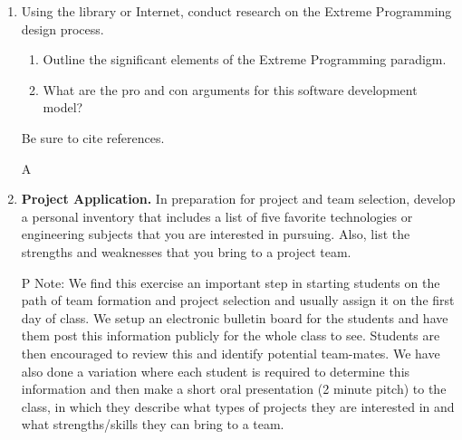 \begin{enumerate}
\item
  Using the library or Internet, conduct research on the Extreme
  Programming design process.
 \begin{enumerate}
\item  Outline the significant elements of the Extreme Programming paradigm.
\item  What are the pro and con arguments for this software development
  model?
\end{enumerate}
Be sure to cite references.

\begin{solution}{A}{





}
\end{solution}

\item
  \textbf{Project Application.} In preparation for project and team
  selection, develop a personal inventory that includes a list of five
  favorite technologies or engineering subjects that you are interested
  in pursuing. Also, list the strengths and weaknesses that you bring to
  a project team.
  \begin{solution}{P}{
Note: We find this exercise an important step in starting
students on the path of team formation and project selection and usually
assign it on the first day of class. We setup an electronic bulletin
board for the students and have them post this information publicly for
the whole class to see. Students are then encouraged to review this and
identify potential team-mates. We have also done a variation where each
student is required to determine this information and then make a short
oral presentation (2 minute pitch) to the class, in which they describe
what types of projects they are interested in and what strengths/skills
they can bring to a team.}
\end{solution}

\end{enumerate}
